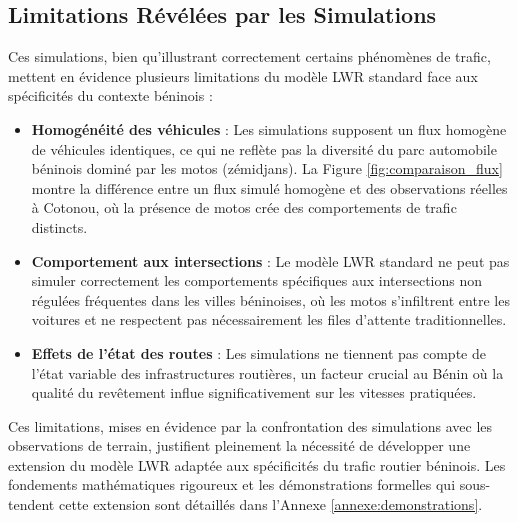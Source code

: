 \subsection{Limitations Révélées par les Simulations}
\label{subsec:limitations_sim}

Ces simulations, bien qu'illustrant correctement certains phénomènes de trafic, mettent en évidence plusieurs limitations du modèle LWR standard face aux spécificités du contexte béninois :

\begin{itemize}
    \item \textbf{Homogénéité des véhicules} : Les simulations supposent un flux homogène de véhicules identiques, ce qui ne reflète pas la diversité du parc automobile béninois dominé par les motos (zémidjans). La Figure \ref{fig:comparaison_flux} montre la différence entre un flux simulé homogène et des observations réelles à Cotonou, où la présence de motos crée des comportements de trafic distincts.
    
    \item \textbf{Comportement aux intersections} : Le modèle LWR standard ne peut pas simuler correctement les comportements spécifiques aux intersections non régulées fréquentes dans les villes béninoises, où les motos s'infiltrent entre les voitures et ne respectent pas nécessairement les files d'attente traditionnelles.
    
    \item \textbf{Effets de l'état des routes} : Les simulations ne tiennent pas compte de l'état variable des infrastructures routières, un facteur crucial au Bénin où la qualité du revêtement influe significativement sur les vitesses pratiquées.
\end{itemize}

Ces limitations, mises en évidence par la confrontation des simulations avec les observations de terrain, justifient pleinement la nécessité de développer une extension du modèle LWR adaptée aux spécificités du trafic routier béninois. Les fondements mathématiques rigoureux et les démonstrations formelles qui sous-tendent cette extension sont détaillés dans l'Annexe \ref{annexe:demonstrations}.

